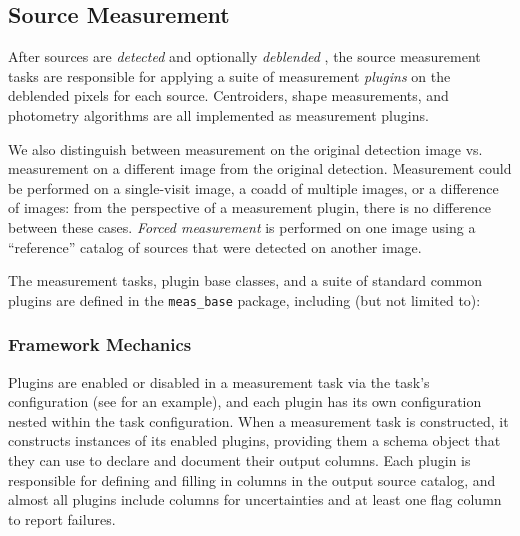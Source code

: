 \subsection{Source Measurement}
\label{sec:measurement}

After sources are \emph{detected}  and optionally \emph{deblended} , the source measurement tasks are responsible for applying a suite of measurement \emph{plugins} on the deblended pixels for each source.
Centroiders, shape measurements, and photometry algorithms are all implemented as measurement plugins.

We also distinguish between measurement on the original detection image vs. measurement on a different image from the original detection.
Measurement could be performed on a single-visit image, a coadd of multiple images, or a difference of images: from the perspective of a measurement plugin, there is no difference between these cases.
\textit{Forced measurement} is performed on one image using a ``reference'' catalog of sources that were detected on another image.

The measurement tasks, plugin base classes, and a suite of standard common plugins are defined in the \texttt{meas\_base} package, including (but not limited to):

\subsubsection{Framework Mechanics}
\label{sec:measurement-interfaces}

Plugins are enabled or disabled in a measurement task via the task's configuration (see  for an example), and each plugin has its own configuration nested within the task configuration.
When a measurement task is constructed, it constructs instances of its enabled plugins, providing them a schema object that they can use to declare and document their output columns.
Each plugin is responsible for defining and filling in columns in the output source catalog, and almost all plugins include columns for uncertainties and at least one flag column to report failures.

